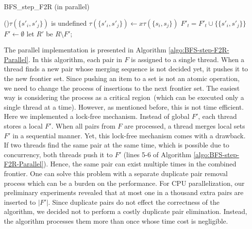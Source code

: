 \documentclass[12pt]{article}
\begin{document}
\begin{algorithm}[ht]
	\caption{BFS\_step\_F2R (in parallel)}
	\label{algo:BFS-step-F2R-Parallel}
	
	
	{
		{
			{
				\If(){$\tau({\{ s'_i,s'_j \}})$ is undefined}
				{
					$\tau(\{ s'_i,s'_j\}) \longleftarrow x \tau(\{ s_i,s_j \})$\;
					$F'_t = F'_t \cup \{ \{ s'_i,s'_j \}  \} $\;
				}
			}
		}
	}
	$F' \longleftarrow \emptyset$\;
	let $R'$ be $R \setminus F'$;
\end{algorithm}

The parallel implementation is presented in Algorithm \ref{algo:BFS-step-F2R-Parallel}. In this algorithm, each pair in $F$ is assigned to a single thread. When a thread finds a new pair whose merging sequence is not decided yet, it pushes it to the new frontier set. Since pushing an item to a set is not an atomic operation, we need to change the process of insertions to the next frontier set. The easiest way is considering the process as a critical region~(which can be executed only a single thread at a time). However, as mentioned before, this is not time efficient. Here we implemented a lock-free mechanism. Instead of global $F'$, each thread stores a local $F'$. When all pairs from $F$ are processed, a thread merges local sets $F'$ in a sequential manner. Yet, this lock-free mechanism comes with a drawback. If two threads find the same pair at the same time, which is possible due to concurrency, both threads push it to $F'$ (lines 5-6 of Algorithm \ref{algo:BFS-step-F2R-Parallel}). Hence, the same pair can exist multiple times in the combined frontier. One can solve this problem with a separate duplicate pair removal process which can be a burden on the performance. For CPU parallelization, our preliminary experiments revealed that at most one in a thousand extra pairs are inserted to $|F'|$. Since duplicate pairs do not effect the correctness of the algorithm, we decided not to perform a costly duplicate pair elimination. Instead, the algorithm processes them more than once whose time cost is negligible. 
\end{document}
